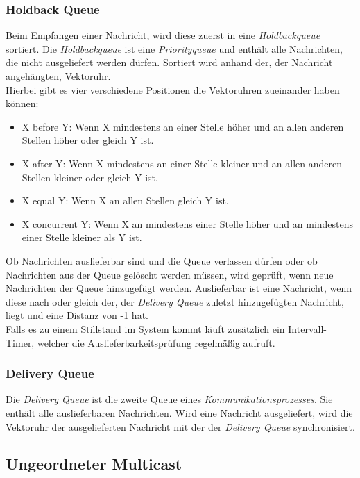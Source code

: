 \subsubsection{Holdback Queue}

Beim Empfangen einer Nachricht, wird diese zuerst in eine \textit{Holdbackqueue} sortiert. Die \textit{Holdbackqueue} ist eine \textit{Priorityqueue} und enthält alle Nachrichten, die nicht ausgeliefert werden dürfen. Sortiert wird anhand der, der Nachricht angehängten, Vektoruhr.\\
Hierbei gibt es vier verschiedene Positionen die Vektoruhren zueinander haben können:
\begin{itemize} \label{positionVTs}
  \item X before Y: Wenn X mindestens an einer Stelle höher und an allen anderen Stellen höher oder gleich Y ist.
  \item X after Y: Wenn X mindestens an einer Stelle kleiner und an allen anderen Stellen kleiner oder gleich Y ist.
  \item X equal Y: Wenn X an allen Stellen gleich Y ist.
  \item X concurrent Y: Wenn X an mindestens einer Stelle höher und an mindestens einer Stelle kleiner als Y ist.
\end{itemize}

Ob Nachrichten auslieferbar sind und die Queue verlassen dürfen oder ob Nachrichten aus der Queue gelöscht werden müssen, wird geprüft, wenn neue Nachrichten der Queue hinzugefügt werden. Auslieferbar ist eine Nachricht, wenn diese nach oder gleich der, der \textit{Delivery Queue} zuletzt hinzugefügten Nachricht, liegt und eine Distanz von -1 hat.\\
Falls es zu einem Stillstand im System kommt läuft zusätzlich ein Intervall-Timer, welcher die Auslieferbarkeitsprüfung regelmäßig aufruft.

\subsubsection{Delivery Queue}

Die \textit{Delivery Queue} ist die zweite Queue eines \textit{Kommunikationsprozesses}. Sie enthält alle auslieferbaren Nachrichten.
Wird eine Nachricht ausgeliefert, wird die Vektoruhr der ausgelieferten Nachricht mit der der \textit{Delivery Queue} synchronisiert.

\subsection{Ungeordneter Multicast}

